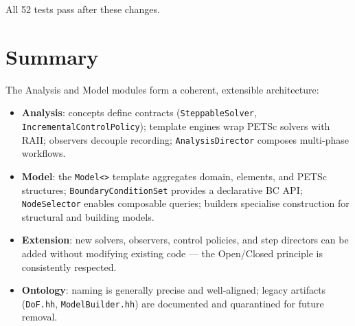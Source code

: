All 52 tests pass after these changes.


\section{Summary}
\label{sec:arch:summary}

The Analysis and Model modules form a coherent, extensible architecture:

\begin{itemize}[nosep]
  \item \textbf{Analysis}: concepts define contracts
        (\texttt{SteppableSolver}, \texttt{IncrementalControlPolicy});
        template engines wrap PETSc solvers with RAII; observers decouple
        recording; \texttt{AnalysisDirector} composes multi-phase workflows.

  \item \textbf{Model}: the \texttt{Model<>} template aggregates domain,
        elements, and PETSc structures; \texttt{BoundaryConditionSet}
        provides a declarative BC API; \texttt{NodeSelector} enables
        composable queries; builders specialise construction for
        structural and building models.

  \item \textbf{Extension}: new solvers, observers, control policies, and
        step directors can be added without modifying existing code ---
        the Open/Closed principle is consistently respected.

  \item \textbf{Ontology}: naming is generally precise and well-aligned;
        legacy artifacts (\texttt{DoF.hh}, \texttt{ModelBuilder.hh}) are
        documented and quarantined for future removal.
\end{itemize}
